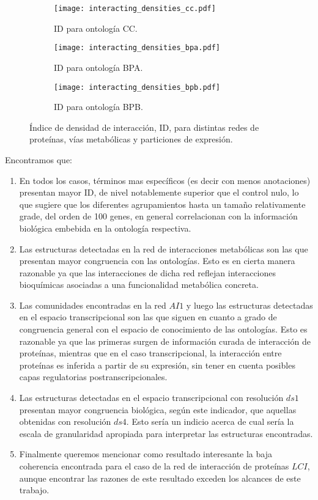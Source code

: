 \begin{figure*}[t!]
    \centering
    \begin{subfigure}[t]{0.45\textwidth}
    \centering
    \texttt{[image: interacting\_densities\_cc.pdf]}
    \caption{ID para ontología CC.}
    \end{subfigure}
    \begin{subfigure}[t]{0.45\textwidth}
    \centering
    \texttt{[image: interacting\_densities\_bpa.pdf]}
    \caption{ID para ontología BPA.}
    \end{subfigure}
    \begin{subfigure}[t]{0.45\textwidth}
    \centering
    \texttt{[image: interacting\_densities\_bpb.pdf]}
    \caption{ID para ontología BPB.}
    \end{subfigure}    
    \caption{Índice de densidad de interacción, ID, para distintas redes de proteínas, vías metabólicas y particiones de expresión.}
    \label{interacting_densities}
\end{figure*}
Encontramos que:
\begin{enumerate}

\item En todos los casos, términos mas específicos (es decir con menos anotaciones) presentan mayor ID, de nivel notablemente superior que el control nulo, lo que sugiere que los diferentes agrupamientos hasta un tamaño relativamente grade, del orden de 100 genes, en general correlacionan con la información biológica embebida en la ontología respectiva.
\item Las estructuras detectadas en la red de interacciones metabólicas son las que presentan mayor congruencia con las ontologías. Esto es en cierta manera razonable ya que las interacciones de dicha red reflejan interacciones bioquímicas asociadas a una funcionalidad metabólica concreta.
\item Las comunidades encontradas en la red $AI1$ y luego las estructuras detectadas en el espacio transcripcional son las que siguen en cuanto a grado de congruencia general con el espacio de conocimiento de las ontologías. Esto es razonable ya que las primeras surgen de información curada de interacción de proteínas, mientras que en el caso transcripcional, la interacción entre proteínas es inferida a partir de su expresión, sin tener en cuenta posibles capas regulatorias postranscripcionales.
\item Las estructuras detectadas en el espacio transcripcional con resolución $ds1$ presentan mayor congruencia biológica, según este indicador, que aquellas obtenidas con resolución $ds4$. Esto sería un indicio acerca de cual sería la escala de granularidad apropiada para interpretar las estructuras encontradas.
\item Finalmente queremos mencionar como resultado interesante la baja coherencia encontrada para el caso de la red de interacción de proteínas $LCI$, aunque encontrar las razones de este resultado exceden los alcances de este trabajo. 
\end{enumerate}
